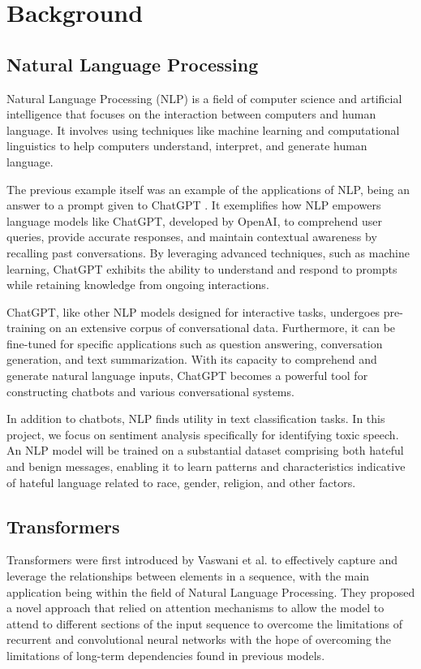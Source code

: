 \chapter{Background}

\section{Natural Language Processing}

Natural Language Processing (NLP) is a field of computer science and artificial intelligence that focuses on the interaction between computers and human language. It involves using techniques like machine learning and computational linguistics to help computers understand, interpret, and generate human language.

The previous example itself was an example of the applications of NLP, being an answer to a prompt given to ChatGPT \cite{ChatGPT}. It exemplifies how NLP empowers language models like ChatGPT, developed by OpenAI, to comprehend user queries, provide accurate responses, and maintain contextual awareness by recalling past conversations. By leveraging advanced techniques, such as machine learning, ChatGPT exhibits the ability to understand and respond to prompts while retaining knowledge from ongoing interactions.

ChatGPT, like other NLP models designed for interactive tasks, undergoes pre-training on an extensive corpus of conversational data. Furthermore, it can be fine-tuned for specific applications such as question answering, conversation generation, and text summarization. With its capacity to comprehend and generate natural language inputs, ChatGPT becomes a powerful tool for constructing chatbots and various conversational systems.

In addition to chatbots, NLP finds utility in text classification tasks. In this project, we focus on sentiment analysis specifically for identifying toxic speech. An NLP model will be trained on a substantial dataset comprising both hateful and benign messages, enabling it to learn patterns and characteristics indicative of hateful language related to race, gender, religion, and other factors.

\section{Transformers}

Transformers were first introduced by Vaswani et al. \cite{transformer_paper} to effectively capture and leverage the relationships between elements in a sequence, with the main application being within the field of Natural Language Processing. They proposed a novel approach that relied on attention mechanisms to allow the model to attend to different sections of the input sequence to overcome the limitations of recurrent and convolutional neural networks with the hope of overcoming the limitations of long-term dependencies found in previous models.

